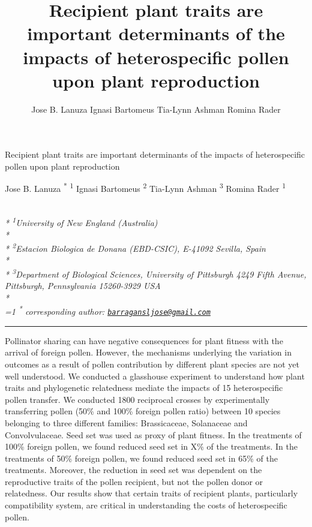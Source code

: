 \documentclass[11pt,a4paper]{article}
\title{Recipient plant traits are important determinants of the impacts of
heterospecific pollen upon plant reproduction}
\author{
Jose B. Lanuza
Ignasi Bartomeus
Tia-Lynn Ashman
Romina Rader
}
\date{}
\begin{document}
\begin{singlespace}
\begin{center}
\huge Recipient plant traits are important determinants of the impacts of
heterospecific pollen upon plant reproduction
\end{center}
\begin{center}
\large
Jose B. Lanuza \textsuperscript{*} \textsuperscript{1} 
Ignasi Bartomeus \textsuperscript{2} 
Tia-Lynn Ashman \textsuperscript{3} 
Romina Rader \textsuperscript{1} 
\end{center}
\begin{justify}
\footnotesize \emph{ 
\\*
\textsuperscript{1}University of New England (Australia)\\*
\\*
\textsuperscript{2}Estacion Biologica de Donana (EBD-CSIC), E-41092 Sevilla, Spain\\*
\\*
\textsuperscript{3}Department of Biological Sciences, University of Pittsburgh 4249 Fifth
Avenue, Pittsburgh, Pennsylvania 15260-3929 USA\\*
}
\setcounter{num}{1}
\\[0.1cm]
\footnotesize \emph{ 
\ifnum\value{num}=1%
\textsuperscript{*} corresponding author:
\fi
\href{mailto:barragansljose@gmail.com}{\nolinkurl{barragansljose@gmail.com}}
}
\end{justify}
\normalsize

\end{singlespace}


\singlespace

\vspace{2mm}\hrule

Pollinator sharing can have negative consequences for plant fitness with
the arrival of foreign pollen. However, the mechanisms underlying the
variation in outcomes as a result of pollen contribution by different
plant species are not yet well understood. We conducted a glasshouse
experiment to understand how plant traits and phylogenetic relatedness
mediate the impacts of 15 heterospecific pollen transfer. We conducted
1800 reciprocal crosses by experimentally transferring pollen (50\% and
100\% foreign pollen ratio) between 10 species belonging to three
different families: Brassicaceae, Solanaceae and Convolvulaceae. Seed
set was used as proxy of plant fitness. In the treatments of 100\%
foreign pollen, we found reduced seed set in X\% of the treatments. In
the treatments of 50\% foreign pollen, we found reduced seed set in 65\%
of the treatments. Moreover, the reduction in seed set was dependent on
the reproductive traits of the pollen recipient, but not the pollen
donor or relatedness. Our results show that certain traits of recipient
plants, particularly compatibility system, are critical in understanding
the costs of heterospecific pollen.
\end{document}
